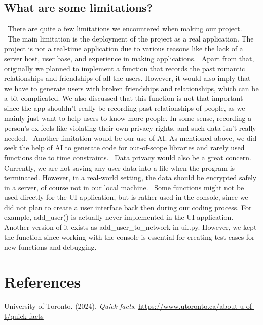 \documentclass[fontsize=11pt]{article}
\begin{document}
\subsection{What are some limitations?}
\ There are quite a few limitations we encountered when making our project.
\ The main limitation is the deployment of the project as a real application. The project is not a real-time application due to various reasons like the lack of a server host, user base, and experience in making applications.
\ Apart from that, originally we planned to implement a function that records the past romantic relationships and friendships of all the users. However, it would also imply that we have to generate users with broken friendships and relationships, which can be a bit complicated. We also discussed that this function is not that important since the app shouldn't really be recording past relationships of people, as we mainly just want to help users to know more people. In some sense, recording a person's ex feels like violating their own privacy rights, and such data isn't really needed.
\ Another limitation would be our use of AI. As mentioned above, we did seek the help of AI to generate code for out-of-scope libraries and rarely used functions due to time constraints.
\ Data privacy would also be a great concern. Currently, we are not saving any user data into a file when the program is terminated. However, in a real-world setting, the data should be encrypted safely in a server, of course not in our local machine.
\ Some functions might not be used directly for the UI application, but is rather used in the console, since we did not plan to create a user interface back then during our coding process. For example, add_user() is actually never implemented in the UI application. Another version of it exists as add_user_to_network in ui..py. However, we kept the function since working with the console is essential for creating test cases for new functions and debugging.



\section{References}
University of Toronto. (2024). \textit{Quick facts}.
\url{https://www.utoronto.ca/about-u-of-t/quick-facts}


\end{document}
